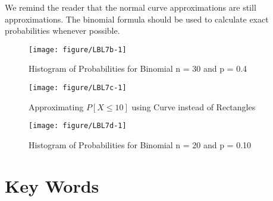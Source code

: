 \documentclass[11pt]{book}\usepackage[]{graphicx}\usepackage[]{color}
\begin{document}

We remind the reader that the normal curve approximations are still approximations.  The binomial formula should be used to calculate exact probabilities whenever possible.

\newpage

\begin{figure}[ht]

\caption{Histogram of Probabilities for Binomial n = 30 and p = 0.4}



{\centering \texttt{[image: figure/LBL7b-1]} 

}




 \end{figure}
 

\begin{figure}[ht]

\caption{Approximating $P[X \le 10]$ using Curve instead of Rectangles}



{\centering \texttt{[image: figure/LBL7c-1]} 

}




\end{figure}


 \begin{figure}[ht]

\caption{Histogram of Probabilities for Binomial n = 20 and p = 0.10}



{\centering \texttt{[image: figure/LBL7d-1]} 

}




\end{figure}


\section{Key Words}
\end{document}
